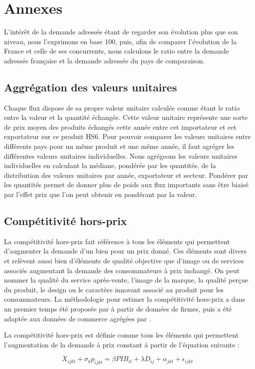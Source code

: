 \documentclass[french,10pt,a4paper]{article}
\newenvironment{annexes}{
    \section*{Annexes}
    \addcontentsline{toc}{section}{Annexes}
    \setstretch{2} %
}{
    \setstretch{1} %
}
\begin{document}
\begin{annexes}
L'intérêt de la demande adressée étant de regarder son évolution plus que son niveau, nous l'exprimons en base 100, puis, afin de comparer l'évolution de la France et celle de ses concurrents, nous calculons le ratio entre la demande adressée française et la demande adressée du pays de comparaison. 

\subsection*{Aggrégation des valeurs unitaires}

Chaque flux dispose de sa propre valeur unitaire calculée comme étant le ratio entre la valeur et la quantité échangée. Cette valeur unitaire représente une sorte de prix moyen des produits échangés cette année entre cet importateur et cet exportateur sur ce produit HS6. Pour pouvoir comparer les valeurs unitaires entre différents pays pour un même produit et une même année, il faut agréger les différentes valeurs unitaires individuelles. Nous agrégeons les valeurs unitaires individuelles en calculant la médiane, pondérée par les quantités, de la distribution des valeurs unitaires par année, exportateur et secteur. Pondérer par les quantités permet de donner plus de poids aux flux importants sans être biaisé par l'effet prix que l'on peut obtenir en pondérant par la valeur.

\subsection*{Compétitivité hors-prix}
La compétitivité hors-prix fait référence à tous les éléments qui permettent d'augmenter la demande d'un bien pour un prix donné. Ces éléments sont divers et relèvent aussi bien d'éléments de qualité objective que d'image ou de services associés augmentant la demande des consommateurs à prix inchangé. On peut nommer la qualité du service après-vente, l'image de la marque, la qualité perçue du produit, le design ou le caractère innovant associé au produit pour les consommateurs. La méthodologie pour estimer la compétitivité hors-prix a dans un premier temps été proposée par \cite{Khandelwal2013} à partir de données de firmes, puis a été adaptée aux données de commerce agrégées par \cite{Bas2015}.

La compétitivité hors-prix est définie comme tous les éléments qui permettent l'augmentation de la demande à prix constant à partir de l'équation suivante :

\begin{equation}
\label{eq:2}
X_{ijkt} + \sigma_{k} p_{ijkt}  = \beta PIB_{it} + \lambda D_{ij} + \alpha_{jkt} + \epsilon_{ijkt}
\end{equation}


\end{annexes}
\end{document}
